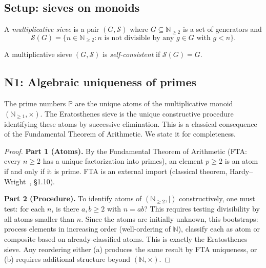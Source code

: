 \documentclass[12pt,a4paper]{article}
\begin{document}
\subsection{Setup: sieves on monoids}
\label{sec:ch2_setup}

\begin{definition}
\label{def:mult_sieve}
A \emph{multiplicative sieve} is a pair $(G, \mathcal{S})$ where
$G \subseteq \mathbb{N}_{\geq 2}$ is a set of generators and
\[
  \mathcal{S}(G) = \{n \in \mathbb{N}_{\geq 2} :
    n \text{ is not divisible by any } g \in G \text{ with } g < n\}.
\]
\end{definition}

\begin{definition}
\label{def:self_consistent}
A multiplicative sieve $(G, \mathcal{S})$ is \emph{self-consistent} if
$\mathcal{S}(G) = G$.
\end{definition}

\subsection{N1: Algebraic uniqueness of primes}
\label{sec:N1}

\mTHM
\begin{theorem}
\label{thm:N1}
The prime numbers $\mathbb{P}$ are the unique atoms of the multiplicative
monoid $(\mathbb{N}_{\geq 1}, \times)$. The Eratosthenes sieve is the
unique constructive procedure identifying these atoms by successive
elimination.
This is a classical consequence of the Fundamental Theorem of Arithmetic.
We state it for completeness.

\begin{proof}
\textbf{Part 1 (Atoms).} By the Fundamental Theorem of Arithmetic
(FTA: every $n \geq 2$ has a unique factorization into primes), an
element $p \geq 2$ is an atom if and only if it is prime. FTA is an
external import (classical theorem, Hardy--Wright~\cite{HardyWright2008}, \S1.10).

\textbf{Part 2 (Procedure).} To identify atoms of $(\mathbb{N}_{\geq 2},|)$
constructively, one must test: for each $n$, is there $a, b \geq 2$ with
$n = ab$? This requires testing divisibility by all atoms smaller than $n$.
Since the atoms are initially unknown, this bootstraps: process elements
in increasing order (well-ordering of $\mathbb{N}$), classify each as atom
or composite based on already-classified atoms. This is exactly the
Eratosthenes sieve. Any reordering either (a) produces the same result
by FTA uniqueness, or (b) requires additional structure beyond
$(\mathbb{N}, \times)$.
\end{proof}
\end{theorem}
\end{document}
